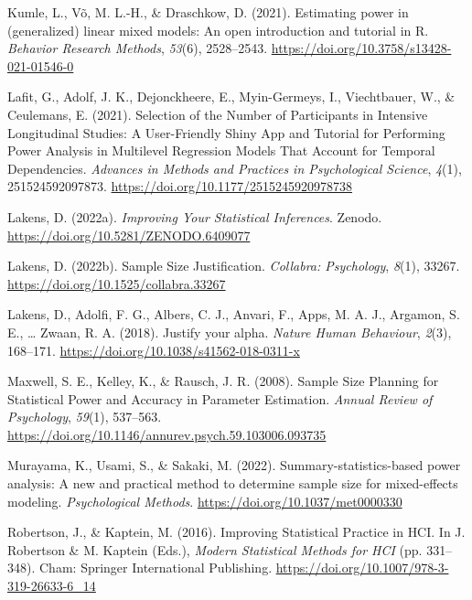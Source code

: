 \documentclass[
  man,floatsintext]{apa6}
\newlength{\cslhangindent}
\newlength{\cslentryspacingunit} %
\newenvironment{CSLReferences}[2] %
 {%
  \setlength{\parindent}{0pt}
  \ifodd #1
  \let\oldpar\par
  \def\par{\hangindent=\cslhangindent\oldpar}
  \fi
  \setlength{\parskip}{#2\cslentryspacingunit}
 }%
 {}
\begin{document}
\begin{CSLReferences}{1}{0}
\leavevmode{}%
Kumle, L., Võ, M. L.-H., \& Draschkow, D. (2021). Estimating power in (generalized) linear mixed models: {An} open introduction and tutorial in {R}. \emph{Behavior Research Methods}, \emph{53}(6), 2528--2543. \url{https://doi.org/10.3758/s13428-021-01546-0}

\leavevmode{}%
Lafit, G., Adolf, J. K., Dejonckheere, E., Myin-Germeys, I., Viechtbauer, W., \& Ceulemans, E. (2021). Selection of the {Number} of {Participants} in {Intensive Longitudinal Studies}: {A User-Friendly Shiny App} and {Tutorial} for {Performing Power Analysis} in {Multilevel Regression Models That Account} for {Temporal Dependencies}. \emph{Advances in Methods and Practices in Psychological Science}, \emph{4}(1), 251524592097873. \url{https://doi.org/10.1177/2515245920978738}

\leavevmode{}%
Lakens, D. (2022a). \emph{Improving {Your Statistical Inferences}}. Zenodo. \url{https://doi.org/10.5281/ZENODO.6409077}

\leavevmode{}%
Lakens, D. (2022b). Sample {Size Justification}. \emph{Collabra: Psychology}, \emph{8}(1), 33267. \url{https://doi.org/10.1525/collabra.33267}

\leavevmode{}%
Lakens, D., Adolfi, F. G., Albers, C. J., Anvari, F., Apps, M. A. J., Argamon, S. E., \ldots{} Zwaan, R. A. (2018). Justify your alpha. \emph{Nature Human Behaviour}, \emph{2}(3), 168--171. \url{https://doi.org/10.1038/s41562-018-0311-x}

\leavevmode{}%
Maxwell, S. E., Kelley, K., \& Rausch, J. R. (2008). Sample {Size Planning} for {Statistical Power} and {Accuracy} in {Parameter Estimation}. \emph{Annual Review of Psychology}, \emph{59}(1), 537--563. \url{https://doi.org/10.1146/annurev.psych.59.103006.093735}

\leavevmode{}%
Murayama, K., Usami, S., \& Sakaki, M. (2022). Summary-statistics-based power analysis: {A} new and practical method to determine sample size for mixed-effects modeling. \emph{Psychological Methods}. \url{https://doi.org/10.1037/met0000330}

\leavevmode{}%
Robertson, J., \& Kaptein, M. (2016). Improving {Statistical Practice} in {HCI}. In J. Robertson \& M. Kaptein (Eds.), \emph{Modern {Statistical Methods} for {HCI}} (pp. 331--348). {Cham}: {Springer International Publishing}. \url{https://doi.org/10.1007/978-3-319-26633-6_14}


\end{CSLReferences}
\end{document}
